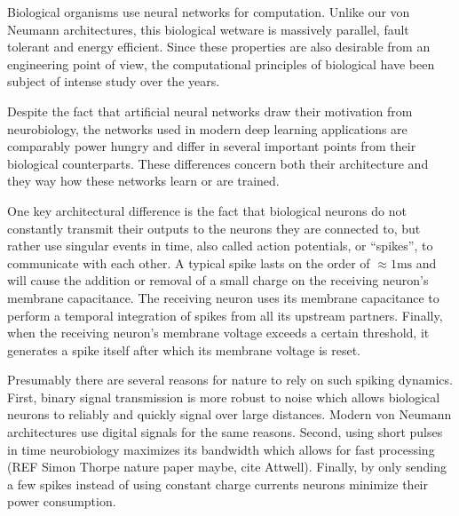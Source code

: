

Biological organisms use neural networks for computation.
Unlike our von Neumann architectures, this biological wetware is
massively parallel, fault tolerant and energy efficient. Since these properties
are also desirable from an engineering point of view, the computational
principles of biological have been subject of intense study over the years.

Despite the fact that artificial neural networks draw their motivation from neurobiology,
the networks used in modern deep learning applications are comparably power
hungry and differ in several important points from their
biological counterparts.
These differences concern both their architecture and they way how these networks learn or
are trained.

One key architectural difference is the fact that biological neurons do not
constantly transmit their outputs to the neurons they are connected to, but
rather use singular events in time, also called action potentials, or
``spikes'', to communicate with each other. A typical spike lasts on the order
of $\approx1\mathrm{ms}$ and will cause the addition or removal of a small charge
on the receiving neuron's membrane capacitance. The receiving neuron uses its
membrane capacitance to perform a temporal integration of spikes
from all its upstream partners. Finally, when the
receiving neuron's membrane voltage exceeds a certain threshold, it
generates a spike itself after which its membrane voltage is reset.

Presumably there are several reasons for nature to rely on such spiking dynamics. First,
binary signal transmission is more robust to noise which allows biological
neurons to reliably and quickly signal over large distances. Modern von Neumann
architectures use digital signals for the same reasons. Second, using short pulses in time neurobiology maximizes its bandwidth which allows for fast processing (REF Simon Thorpe nature paper maybe, cite Attwell).
Finally, by only sending a few spikes instead of using constant charge currents neurons minimize their power consumption.

